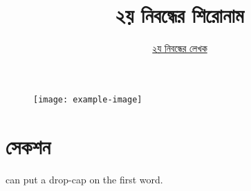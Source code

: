 \documentclass[12pt]{article}
\begin{document}
\begin{figure}[t]
        \centering
        \texttt{[image: example-image]}
\end{figure}

\title{২য় নিবন্ধের শিরোনাম}
\author{\href{https://github.com/rafisics/ebook-template}{২য় নিবন্ধের লেখক}}
\date{}


\section{সেকশন}

 can put a drop-cap on the first word.
\lipsum



\end{document}
